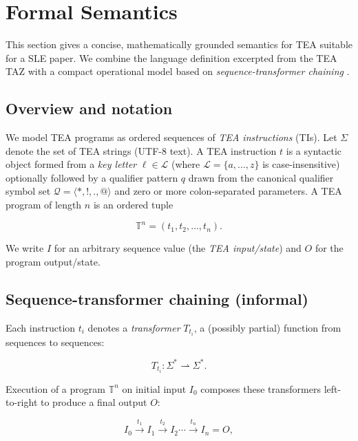 \documentclass[acmtoplas]{acmart}
\begin{document}
\section{Formal Semantics}
\label{sec:formal-semantics}

This section gives a concise, mathematically grounded semantics for TEA suitable for a SLE paper.  We combine the language definition excerpted from the TEA TAZ \cite{Lutalo2024TEATAZ} with a compact operational model based on \emph{sequence-transformer chaining} \cite{Lutalo2025_transformatics_thesis}. 

\subsection{Overview and notation}
We model TEA programs as ordered sequences of \emph{TEA instructions} (TIs).  Let \(\Sigma\) denote the set of TEA strings (UTF-8 text).  A TEA instruction \(t\) is a syntactic object formed from a \emph{key letter} \( \ell \in \mathcal{L} \) (where \(\mathcal{L}=\{a,\dots,z\}\) is case-insensitive) optionally followed by a qualifier pattern \(q\) drawn from the canonical qualifier symbol set \(\mathcal{Q} = \langle *,!,.,@\rangle\) and zero or more colon-separated parameters.  A TEA program of length \(n\) is an ordered tuple

\vspace{1em}
\[
\mathbb{T}^n = (t_1, t_2, \dots, t_n).
\]
\vspace{1em}

We write \(I\) for an arbitrary sequence value (the \emph{TEA input/state}) and \(O\) for the program output/state.

\subsection{Sequence-transformer chaining (informal)}
Each instruction \(t_i\) denotes a \emph{transformer} \(T_{t_i}\), a (possibly partial) function from sequences to sequences:

\vspace{1em}
\[
T_{t_i} : \Sigma^* \rightharpoonup \Sigma^*.
\]
\vspace{1em}

Execution of a program \(\mathbb{T}^n\) on initial input \(I_0\) composes these transformers left-to-right to produce a final output \(O\):

\vspace{1em}
\[
I_0 \xrightarrow{t_1} I_1 \xrightarrow{t_2} I_2 \cdots \xrightarrow{t_n} I_{n} = O,
\]
\vspace{1em}
\end{document}
